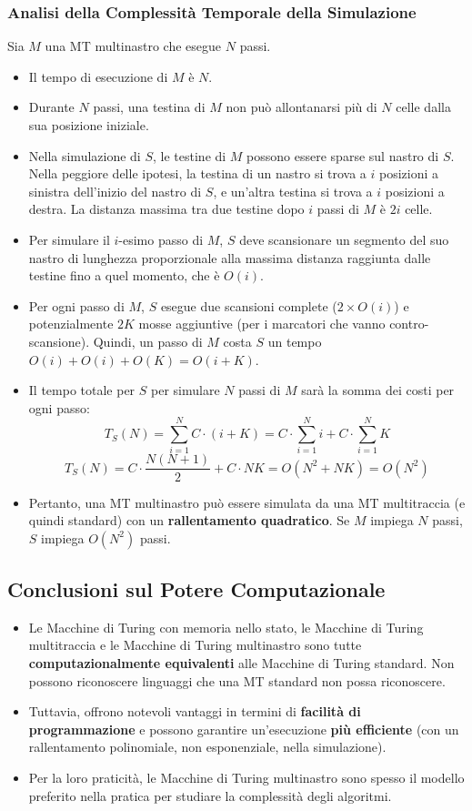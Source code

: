 \documentclass[a4paper]{article}
\begin{document}
\subsubsection{Analisi della Complessità Temporale della Simulazione}
Sia $M$ una MT multinastro che esegue $N$ passi.
\begin{itemize}
    \item Il tempo di esecuzione di $M$ è $N$.
    \item Durante $N$ passi, una testina di $M$ non può allontanarsi più di $N$ celle dalla sua posizione iniziale.
    \item Nella simulazione di $S$, le testine di $M$ possono essere sparse sul nastro di $S$. Nella peggiore delle ipotesi, la testina di un nastro si trova a $i$ posizioni a sinistra dell'inizio del nastro di $S$, e un'altra testina si trova a $i$ posizioni a destra. La distanza massima tra due testine dopo $i$ passi di $M$ è $2i$ celle.
    \item Per simulare il $i$-esimo passo di $M$, $S$ deve scansionare un segmento del suo nastro di lunghezza proporzionale alla massima distanza raggiunta dalle testine fino a quel momento, che è $O(i)$.
    \item Per ogni passo di $M$, $S$ esegue due scansioni complete ($2 \times O(i)$) e potenzialmente $2K$ mosse aggiuntive (per i marcatori che vanno contro-scansione). Quindi, un passo di $M$ costa $S$ un tempo $O(i) + O(i) + O(K) = O(i+K)$.
    \item Il tempo totale per $S$ per simulare $N$ passi di $M$ sarà la somma dei costi per ogni passo:
    \[
    T_S(N) = \sum_{i=1}^{N} C \cdot (i + K) = C \cdot \sum_{i=1}^{N} i + C \cdot \sum_{i=1}^{N} K
    \]
    \[
    T_S(N) = C \cdot \frac{N(N+1)}{2} + C \cdot NK = O(N^2 + NK) = O(N^2)
    \]
    \item Pertanto, una MT multinastro può essere simulata da una MT multitraccia (e quindi standard) con un \textbf{rallentamento quadratico}. Se $M$ impiega $N$ passi, $S$ impiega $O(N^2)$ passi.
\end{itemize}

\subsection{Conclusioni sul Potere Computazionale}
\begin{itemize}
    \item Le Macchine di Turing con memoria nello stato, le Macchine di Turing multitraccia e le Macchine di Turing multinastro sono tutte \textbf{computazionalmente equivalenti} alle Macchine di Turing standard. Non possono riconoscere linguaggi che una MT standard non possa riconoscere.
    \item Tuttavia, offrono notevoli vantaggi in termini di \textbf{facilità di programmazione} e possono garantire un'esecuzione \textbf{più efficiente} (con un rallentamento polinomiale, non esponenziale, nella simulazione).
    \item Per la loro praticità, le Macchine di Turing multinastro sono spesso il modello preferito nella pratica per studiare la complessità degli algoritmi.
\end{itemize}
\end{document}
